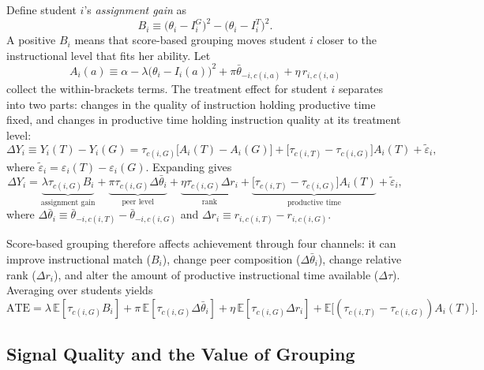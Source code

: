 \documentclass[11pt]{article}
\newcommand{\E}{\mathbb{E}}
\begin{document}
Define student $i$'s \emph{assignment gain} as
\begin{equation}
\label{eq:Bi}
B_i \equiv \big(\theta_i - I_i^G\big)^2 - \big(\theta_i - I_i^T\big)^2.
\end{equation}
A positive $B_i$ means that score-based grouping moves student $i$ closer to the instructional level that fits her ability. Let
\begin{equation}
A_i(a) \equiv \alpha - \lambda\big(\theta_i - I_i(a)\big)^2 + \pi\bar{\theta}_{-i,c(i,a)} + \eta\, r_{i,c(i,a)}
\end{equation}
collect the within-brackets terms. The treatment effect for student $i$ separates into two parts: changes in the quality of instruction holding productive time fixed, and changes in productive time holding instruction quality at its treatment level:
\begin{equation}
\label{eq:decomp}
\Delta Y_i \equiv Y_i(T) - Y_i(G) = \tau_{c(i,G)}\big[A_i(T) - A_i(G)\big] + \big[\tau_{c(i,T)} - \tau_{c(i,G)}\big] A_i(T) + \tilde{\varepsilon}_i,
\end{equation}
where $\tilde{\varepsilon}_i = \varepsilon_i(T) - \varepsilon_i(G)$. Expanding gives
\begin{equation}
\label{eq:decomp_full}
\Delta Y_i = \underbrace{\lambda\tau_{c(i,G)} B_i}_{\text{assignment gain}} + \underbrace{\pi\tau_{c(i,G)}\Delta\bar{\theta}_i}_{\text{peer level}} + \underbrace{\eta\tau_{c(i,G)}\Delta r_i}_{\text{rank}} + \underbrace{\big[\tau_{c(i,T)} - \tau_{c(i,G)}\big] A_i(T)}_{\text{productive time}} + \tilde{\varepsilon}_i,
\end{equation}
where $\Delta\bar{\theta}_i \equiv \bar{\theta}_{-i,c(i,T)} - \bar{\theta}_{-i,c(i,G)}$ and $\Delta r_i \equiv r_{i,c(i,T)} - r_{i,c(i,G)}$.

Score-based grouping therefore affects achievement through four channels: it can improve instructional match ($B_i$), change peer composition ($\Delta\bar{\theta}_i$), change relative rank ($\Delta r_i$), and alter the amount of productive instructional time available ($\Delta\tau$). Averaging over students yields
\begin{equation}
\label{eq:ate}
\text{ATE} = \lambda\,\E[\tau_{c(i,G)} B_i] + \pi\,\E[\tau_{c(i,G)}\Delta\bar{\theta}_i] + \eta\,\E[\tau_{c(i,G)}\Delta r_i] + \E\!\big[(\tau_{c(i,T)} - \tau_{c(i,G)})A_i(T)\big].
\end{equation}

\subsection{Signal Quality and the Value of Grouping}
\end{document}
